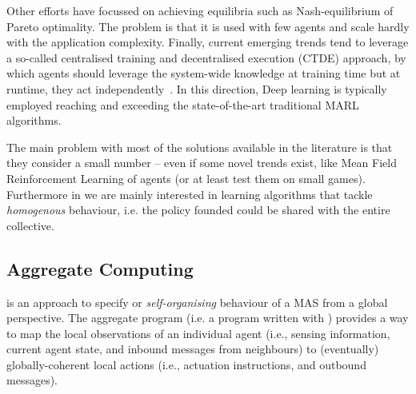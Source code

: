 \documentclass[11pt]{article}
\begin{document}
Other efforts have focussed on achieving equilibria such as Nash-equilibrium of Pareto optimality.
The problem is that it is used with few agents and scale hardly with the application complexity.
%
Finally, current emerging trends tend to leverage a so-called centralised training and decentralised execution (CTDE) approach, by which 
 agents should leverage the system-wide knowledge at training time but at runtime, they act independently~\cite{DBLP:journals/aamas/Hernandez-LealK19}. In this direction, Deep learning is typically employed reaching and exceeding the state-of-the-art traditional MARL algorithms.
 
The main problem with most of the solutions available in the literature is that they consider a  small number -- even if some novel trends exist, like Mean Field Reinforcement Learning of agents (or at least test them on small games).
Furthermore in \cpsw{} we are mainly interested in learning algorithms that tackle \emph{homogenous} behaviour, i.e. the policy founded could be shared with the entire collective.
\subsection{Aggregate Computing}

\ac{} is an approach to specify or \emph{self-organising} behaviour of a MAS from a global perspective.
%
The aggregate program (i.e. a program written with \ac{}) provides a way to map the local observations of an individual agent (i.e., sensing information, current agent state, and inbound messages from neighbours) to (eventually) globally-coherent local actions
 (i.e., actuation instructions, and outbound messages).
%
\end{document}
